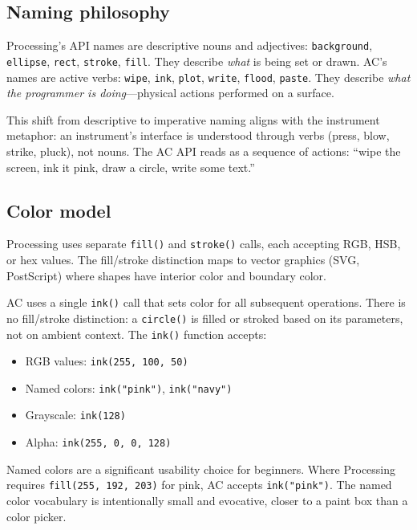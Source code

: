 \documentclass[10pt,letterpaper,twocolumn]{article}
\begin{document}
\subsection{Naming philosophy}

Processing's API names are descriptive nouns and adjectives: \texttt{background}, \texttt{ellipse}, \texttt{rect}, \texttt{stroke}, \texttt{fill}. They describe \emph{what} is being set or drawn. AC's names are active verbs: \texttt{wipe}, \texttt{ink}, \texttt{plot}, \texttt{write}, \texttt{flood}, \texttt{paste}. They describe \emph{what the programmer is doing}---physical actions performed on a surface.

This shift from descriptive to imperative naming aligns with the instrument metaphor: an instrument's interface is understood through verbs (press, blow, strike, pluck), not nouns. The AC API reads as a sequence of actions: ``wipe the screen, ink it pink, draw a circle, write some text.''

\subsection{Color model}

Processing uses separate \texttt{fill()} and \texttt{stroke()} calls, each accepting RGB, HSB, or hex values. The fill/stroke distinction maps to vector graphics (SVG, PostScript) where shapes have interior color and boundary color.

AC uses a single \texttt{ink()} call that sets color for all subsequent operations. There is no fill/stroke distinction: a \texttt{circle()} is filled or stroked based on its parameters, not on ambient context. The \texttt{ink()} function accepts:

\begin{itemize}
  \item RGB values: \texttt{ink(255, 100, 50)}
  \item Named colors: \texttt{ink("pink")}, \texttt{ink("navy")}
  \item Grayscale: \texttt{ink(128)}
  \item Alpha: \texttt{ink(255, 0, 0, 128)}
\end{itemize}

Named colors are a significant usability choice for beginners. Where Processing requires \texttt{fill(255, 192, 203)} for pink, AC accepts \texttt{ink("pink")}. The named color vocabulary is intentionally small and evocative, closer to a paint box than a color picker.
\end{document}
